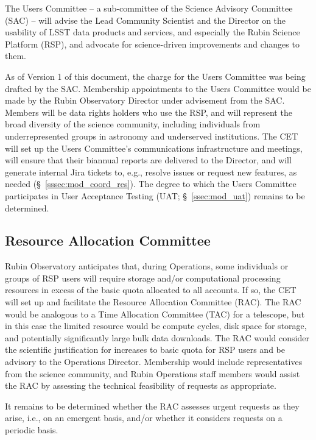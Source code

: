 \documentclass[DM,lsstdraft,toc]{lsstdoc}
\begin{document}
The Users Committee -- a sub-committee of the Science Advisory Committee (SAC) -- will advise the Lead Community Scientist and the Director on the usability of LSST data products and services, and especially the Rubin Science Platform (RSP), and advocate for science-driven improvements and changes to them.

As of Version 1 of this document, the charge for the Users Committee was being drafted by the SAC.
Membership appointments to the Users Committee would be made by the Rubin Observatory Director under advisement from the SAC.
Members will be data rights holders who use the RSP, and will represent the broad diversity of the science community, including individuals from underrepresented groups in astronomy and underserved institutions.
The CET will set up the Users Committee's communications infrastructure and meetings, will ensure that their biannual reports are delivered to the Director, and will generate internal Jira tickets to, e.g., resolve issues or request new features, as needed (\S~\ref{sssec:mod_coord_res}).
The degree to which the Users Committee participates in User Acceptance Testing (UAT; \S~\ref{ssec:mod_uat}) remains to be determined.


\subsection{Resource Allocation Committee}\label{sssec:mod_coord_rac}

Rubin Observatory anticipates that, during Operations, some individuals or groups of RSP users will require storage and/or computational processing resources in excess of the basic quota allocated to all accounts.
If so, the CET will set up and facilitate the Resource Allocation Committee (RAC).
The RAC would be analogous to a Time Allocation Committee (TAC) for a telescope, but in this case the limited resource would be compute cycles, disk space for storage, and potentially significantly large bulk data downloads.
The RAC would consider the scientific justification for increases to basic quota for RSP users and be advisory to the Operations Director.
Membership would include representatives from the science community, and Rubin Operations staff members would assist the RAC by assessing the technical feasibility of requests as appropriate.

It remains to be determined whether the RAC assesses urgent requests as they arise, i.e., on an emergent basis, and/or whether it considers requests on a periodic basis.
\end{document}
